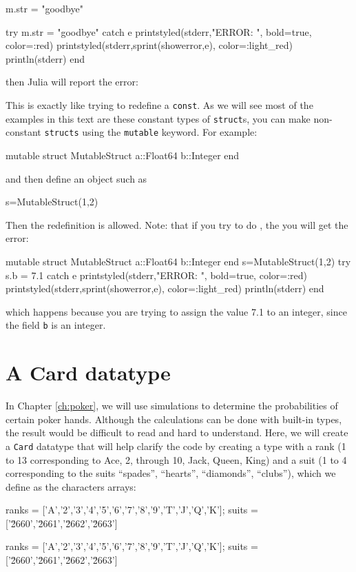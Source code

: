 \begin{jlverbatim}
m.str = "goodbye"
\end{jlverbatim}
\begin{jlcode}
try
  m.str = "goodbye"
catch e
 printstyled(stderr,"ERROR: ", bold=true, color=:red)
 printstyled(stderr,sprint(showerror,e), color=:light_red)
 println(stderr)
end
\end{jlcode}
%
%
then Julia will report the error:
\stderrpythontex[verbatim]

This is exactly like trying to redefine a \texttt{const}.  As we will see most of the examples in this text are these constant types of \texttt{struct}s, you can make non-constant \texttt{structs} using the \texttt{mutable} keyword.  For example:
%
\begin{jlblock}[newtype]
mutable struct MutableStruct
  a::Float64
  b::Integer
end
\end{jlblock}
%
and then define an object such as
\begin{jlblock}[newtype]
s=MutableStruct(1,2)
\end{jlblock}
%
Then the redefinition  is allowed.  Note: that if you try to do , the you will get the error:
\begin{jlcode}[newtype2]
mutable struct MutableStruct
  a::Float64
  b::Integer
end
s=MutableStruct(1,2)
try
  s.b = 7.1
catch e
 printstyled(stderr,"ERROR: ", bold=true, color=:red)
 printstyled(stderr,sprint(showerror,e), color=:light_red)
 println(stderr)
end
\end{jlcode}
\stderrpythontex[verbatim]
%
which happens because you are trying to assign the value 7.1 to an integer, since the field \texttt{b} is an integer.    


\section{A Card datatype}

In Chapter \ref{ch:poker}, we will use simulations to determine the probabilities of certain poker hands. Although the calculations can be done with built-in types, the result would be difficult to read and hard to understand.  Here, we will create a \texttt{Card} datatype that will help clarify the code by creating a type with a rank (1 to 13 corresponding to Ace, 2, through 10, Jack, Queen, King) and a suit (1 to 4 corresponding to the suits ``spades'', ``hearts'', ``diamonds'', ``clubs''), which we define as the characters arrays:
%
\begin{jlblock}[newtype2]
ranks = ['A','2','3','4','5','6','7','8','9','T','J','Q','K'];
suits = ['\u2660','\u2661','\u2662','\u2663']
\end{jlblock}
\begin{jlcode}[newtype]
ranks = ['A','2','3','4','5','6','7','8','9','T','J','Q','K'];
suits = ['\u2660','\u2661','\u2662','\u2663']
\end{jlcode}


